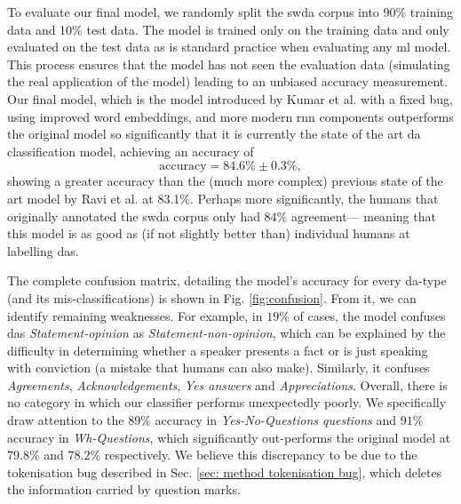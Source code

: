     To evaluate our final \gls{model}, we randomly split the \gls{swda} corpus into 90\% training data and 10\% test data. The \gls{model} is trained only on the training data and only evaluated on the test data as is standard practice when evaluating any \gls{ml} \gls{model}\cite{mlTextbook}. This process ensures that the \gls{model} has not seen the evaluation data (simulating the real application of the \gls{model}) leading to an unbiased accuracy measurement.
    Our final \gls{model}, which is the \gls{model} introduced by Kumar et al.\cite{kumar2017dialogue} with a fixed bug, using improved word \glspl{embedding}, and more modern \gls{rnn} components outperforms the original \gls{model} so significantly that it is currently the state of the art \gls{da} classification \gls{model}, achieving an accuracy of
    \begin{equation}
        \text{accuracy} = 84.6 \% \pm 0.3\%,
        \label{eq: my da model accuracy}
    \end{equation}
    showing a greater accuracy than the (much more complex) previous state of the art \gls{model} by Ravi et al. at 83.1\%\cite{ravi2018self}. Perhaps more significantly, the humans that originally annotated the \gls{swda} corpus only had 84\% agreement\cite{swda}--- meaning that this \gls{model} is as good as (if not slightly better than) individual humans at labelling \glspl{da}. 
    
    The complete confusion matrix, detailing the model's accuracy for every \gls{da}-type (and its mis-classifications) is shown in Fig. \ref{fig:confusion}. From it, we can identify remaining weaknesses. For example, in $19\%$ of cases, the model confuses \glspl{da} \textit{Statement-opinion} as \textit{Statement-non-opinion}, which can be explained by the difficulty in determining whether a speaker presents a fact or is just speaking with conviction (a mistake that humans can also make). Similarly, it confuses \textit{Agreements}, \textit{Acknowledgements}, \textit{Yes answers} and \textit{Appreciations}. Overall, there is no category in which our classifier performs unexpectedly poorly. We specifically draw attention to the $89 \%$ accuracy in \textit{Yes-No-Questions questions} and $91\%$ accuracy in \textit{Wh-Questions}, which significantly out-performs the original model at $79.8\%$ and $78.2\%$ respectively\cite{kumar2017dialogue}. We believe this discrepancy to be due to the tokenisation bug described in Sec. \ref{sec: method tokenisation bug}, which deletes the information carried by question marks. \newline
